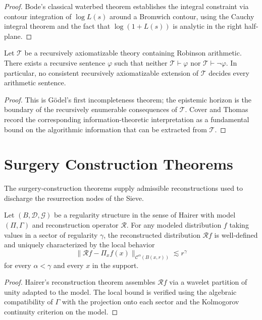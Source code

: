 \begin{proof}
Bode's classical waterbed theorem establishes the integral constraint via contour integration of $\log L(s)$ around a Bromwich contour, using the Cauchy integral theorem and the fact that $\log(1 + L(s))$ is analytic in the right half-plane.
\end{proof}

\begin{theorem}\label{thm-epistemic-horizon}
Let $\mathcal T$ be a recursively axiomatizable theory containing Robinson arithmetic. There exists a recursive sentence $\varphi$ such that neither $\mathcal T \vdash \varphi$ nor $\mathcal T \vdash \neg \varphi$. In particular, no consistent recursively axiomatizable extension of $\mathcal T$ decides every arithmetic sentence.
\end{theorem}

\begin{proof}
This is G\"odel's first incompleteness theorem; the epistemic horizon is the boundary of the recursively enumerable consequences of $\mathcal T$. Cover and Thomas record the corresponding information-theoretic interpretation as a fundamental bound on the algorithmic information that can be extracted from $\mathcal T$.
\end{proof}

\section{Surgery Construction Theorems}

The surgery-construction theorems supply admissible reconstructions used to discharge the resurrection nodes of the Sieve.

\begin{theorem}\label{thm-regularity-lift}
Let $(B, \mathcal D, \mathcal G)$ be a regularity structure in the sense of Hairer with model $(\Pi, \Gamma)$ and reconstruction operator $\mathcal R$. For any modeled distribution $f$ taking values in a sector of regularity $\gamma$, the reconstructed distribution $\mathcal R f$ is well-defined and uniquely characterized by the local behavior
\[
\bigl\| \mathcal R f - \Pi_x f(x)\bigr\|_{\mathcal C^\alpha(B(x,r))} \lesssim r^\gamma
\]
for every $\alpha < \gamma$ and every $x$ in the support.
\end{theorem}

\begin{proof}
Hairer's reconstruction theorem assembles $\mathcal R f$ via a wavelet partition of unity adapted to the model. The local bound is verified using the algebraic compatibility of $\Gamma$ with the projection onto each sector and the Kolmogorov continuity criterion on the model.
\end{proof}

